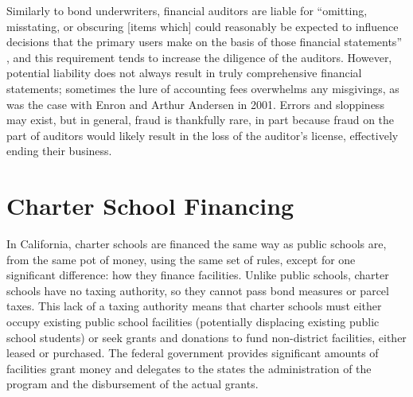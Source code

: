 Similarly to bond underwriters, financial auditors are liable for ``omitting, misstating, or obscuring [items which] could reasonably be expected to influence decisions that the primary users make on the basis of those financial statements'' \parencite{Cayamanda2020}, and this requirement tends to increase the diligence of the auditors. However, potential liability does not always result in truly comprehensive financial statements; sometimes the lure of accounting fees overwhelms any misgivings, as was the case with Enron and Arthur Andersen in 2001. Errors and sloppiness may exist, but in general, fraud is thankfully rare, in part because fraud on the part of auditors would likely result in the loss of the auditor's license, effectively ending their business. 

\section{Charter School Financing}\label{sec:charter-school-financing}\indent

In California, charter schools are financed the same way as public schools are, from the same pot of money, using the same set of rules, except for one significant difference: how they finance facilities. Unlike public schools, charter schools have no taxing authority, so they cannot pass bond measures or parcel taxes. This lack of a taxing authority means that charter schools must either occupy existing public school facilities (potentially displacing existing public school students) or seek grants and donations to fund non-district facilities, either leased or purchased. The federal government provides significant amounts of facilities grant money and delegates to the states the administration of the program and the disbursement of the actual grants. 

